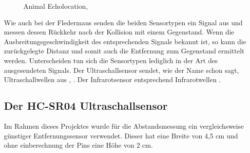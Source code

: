 \begin{figure}[H]
	\centering
	\caption[Ultraschallwellen einer Fledermaus]{Animal Echolocation, \protect{}} \label{fig:withSource} %
\end{figure}

Wie auch bei der Fledermaus senden die beiden Sensortypen ein Signal aus und messen dessen Rückkehr nach der Kollision mit einem Gegenstand. Wenn die Ausbreitungsgeschwindigkeit des entsprechenden Signals bekannt ist, so kann die zurückgelegte Distanz und somit auch die Entfernung zum Gegenstand ermittelt werden. Unterscheiden tun sich die Sensortypen lediglich in der Art des ausgesendeten Signals. Der Ultraschallsensor sendet, wie der Name schon sagt, Ultraschallwellen aus \protect{}, \protect{}. Der Infrarotsensor entsprechend Infrarotwellen \protect{}.


\subsection{Der HC-SR04 Ultraschallsensor}
Im Rahmen dieses Projektes wurde für die Abstandsmessung ein vergleichsweise günstiger Entfernungssensor verwendet. Dieser hat eine Breite von 4,5 cm und ohne einberechnung der Pins eine Höhe von 2 cm.

